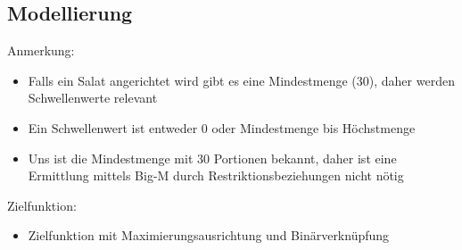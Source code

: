 \documentclass[a4paper,11pt]{article}
\begin{document}
\subsection*{Modellierung}

Anmerkung: \\
\begin{itemize}
    \item Falls ein Salat angerichtet wird gibt es eine Mindestmenge (30), daher werden Schwellenwerte relevant \\
    \item Ein Schwellenwert ist entweder 0 oder Mindestmenge bis Höchstmenge \\
    \item Uns ist die Mindestmenge mit 30 Portionen bekannt, daher ist eine Ermittlung mittels Big-M durch Restriktionsbeziehungen nicht nötig
\end{itemize}
    \bigbreak
    Zielfunktion: \\
\begin{itemize}
    \item Zielfunktion mit Maximierungsausrichtung und Binärverknüpfung
\end{itemize}
\end{document}
